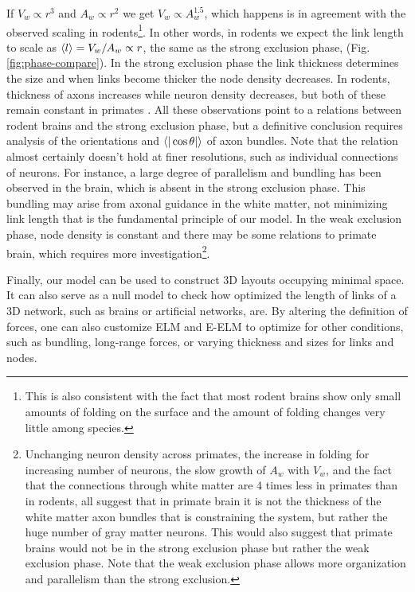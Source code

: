 \documentclass[nofootinbib,preprint,floatfix,titlepage,endfloats]{revtex4} %
\begin{document}
If $V_w \propto r^3$ and $A_w \propto r^2$ we get $V_w \propto A_w^{1.5}$, which happens is in agreement with the observed scaling in rodents\footnote{This is also consistent with the fact that most rodent brains show only small amounts of folding on the surface and the amount of folding changes very little among species.}. In other words, in rodents we expect the link length to scale as $ \left<l\right> = V_w/A_w \propto r $, the same as the strong exclusion phase, (Fig. \ref{fig:phase-compare}). 
In the strong exclusion phase the link thickness determines the size and when links become thicker the node density decreases. 
In rodents, thickness of axons increases while neuron density decreases, but both of these remain constant in primates \cite{herculano2012remarkable}. 
All these observations point to a relations between rodent brains and the strong exclusion phase, but a definitive conclusion requires analysis of the orientations and $\be{|\cos\theta|}$ of axon bundles.%
Note that the relation almost certainly doesn't hold at finer resolutions, such as individual connections of neurons. 
For instance, a large degree of parallelism and bundling has been observed in the brain\cite{le2001diffusion,assaf2008diffusion}, which is absent in the strong exclusion phase. This bundling may arise from axonal guidance in the white matter, not minimizing link length that is the fundamental principle of our model.
In the weak exclusion phase, node density is constant and there may be some relations to primate brain, which requires more investigation\footnote{
Unchanging neuron density across primates, the increase in folding for increasing number of neurons, the slow growth of $A_w$ with $V_w$, and the fact that the connections through white matter are 4 times less in primates than in rodents\cite{herculano2012remarkable}, all suggest that in primate brain it is not the thickness of the white matter axon bundles that is constraining the system, but rather the huge number of gray matter neurons. 
This would also suggest that primate brains would not be in the strong exclusion phase but rather the weak exclusion phase. Note that the weak exclusion phase allows more organization and parallelism than the strong exclusion.}.


Finally, our model can be used to construct 3D layouts occupying minimal space. 
It can also serve  as a null model to check how optimized the length of links of a 3D network, such as brains or artificial networks, are. 
By altering the definition  of forces, one can also customize ELM and E-ELM to optimize for other conditions, such as bundling, long-range forces, or varying thickness and sizes for links and nodes. 



\newpage
\newpage
\end{document}
